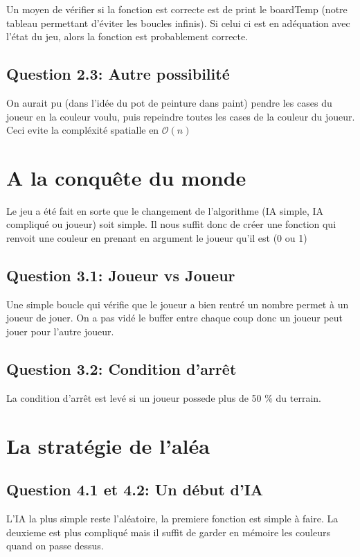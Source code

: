 \documentclass{article}
\begin{document}
    Un moyen de vérifier si la fonction est correcte est de print le boardTemp (notre tableau permettant d'éviter les boucles infinis). Si celui ci est en adéquation avec l'état du jeu, alors la fonction est probablement correcte.

    \subsection{Question 2.3: Autre possibilité}
    On aurait pu (dans l'idée du pot de peinture dans paint) pendre les cases du joueur en la couleur voulu, puis repeindre toutes les cases de la couleur du joueur. Ceci evite la compléxité spatialle en $\mathcal{O}(n)$

    \section{A la conquête du monde}

    Le jeu a été fait en sorte que le changement de l'algorithme (IA simple, IA compliqué ou joueur) soit simple. Il nous suffit donc de créer une fonction qui renvoit une couleur en prenant en argument le joueur qu'il est (0 ou 1)

    \subsection{Question 3.1: Joueur vs Joueur}

    Une simple boucle qui vérifie que le joueur a bien rentré un nombre permet à un joueur de jouer. On a pas vidé le buffer entre chaque coup donc un joueur peut jouer pour l'autre joueur.

    \subsection{Question 3.2: Condition d'arrêt}

    La condition d'arrêt est levé si un joueur possede plus de 50 \% du terrain.

    \section{La stratégie de l'aléa}

    \subsection{Question 4.1 et 4.2: Un début d'IA}

    L'IA la plus simple reste l'aléatoire, la premiere fonction est simple à faire. La deuxieme est plus compliqué mais il suffit de garder en mémoire les couleurs quand on passe dessus.
\end{document}
